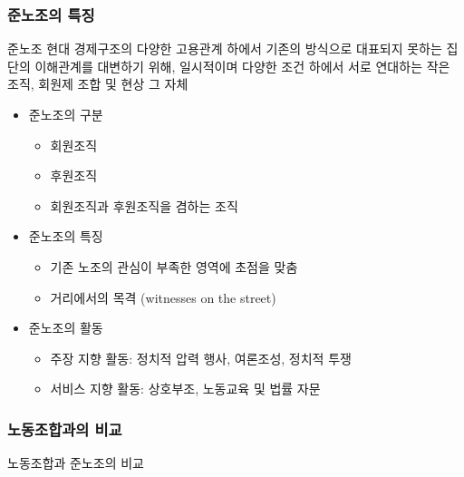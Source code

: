 \documentclass[aspectratio=169,xcolor=dvipsnames,handout]{beamer}
\begin{document}
\begin{frame}[allowframebreaks]
    \frametitle{준노조의 특징}
    \begin{block}{준노조}
        현대 경제구조의 다양한 고용관계 하에서 기존의 방식으로 대표되지 못하는 집단의 이해관계를 대변하기 위해, 일시적이며 다양한 조건 하에서 서로 연대하는 작은 조직, 회원제 조합 및 현상 그 자체
    \end{block}
    \begin{itemize}[<+->]
        \item 준노조의 구분
        \begin{itemize}
            \item 회원조직
            \item 후원조직
            \item 회원조직과 후원조직을 겸하는 조직
        \end{itemize}
        \framebreak%
        \item 준노조의 특징
        \begin{itemize}
            \item 기존 노조의 관심이 부족한 영역에 초점을 맞춤
            \item 거리에서의 목격 (witnesses on the street)
        \end{itemize}
        \item 준노조의 활동
        \begin{itemize}
            \item 주장 지향 활동: 정치적 압력 행사, 여론조성, 정치적 투쟁
            \item 서비스 지향 활동: 상호부조, 노동교육 및 법률 자문
        \end{itemize}
    \end{itemize}
\end{frame}

\begin{frame}
    \frametitle{노동조합과의 비교}
    \begin{table}
        \centering
        \resizebox{.8\textwidth}{!}{\relax
            
        }
        \caption{노동조합과 준노조의 비교}
    \end{table}
\end{frame}
\end{document}
